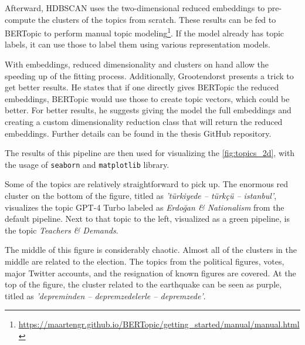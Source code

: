 Afterward, HDBSCAN uses the two-dimensional reduced embeddings to pre-compute the clusters of 
the topics from scratch. These results can be fed to BERTopic to perform manual topic 
modeling\footnote{\url{https://maartengr.github.io/BERTopic/getting_started/manual/manual.html}}.
If the model already has topic labels, it can use those to label them using various 
representation models.

With embeddings, reduced dimensionality and clusters on hand allow the speeding up of the fitting 
process. Additionally, Grootendorst presents a trick to get better results. 
He states that if one directly gives BERTopic the reduced embeddings, BERTopic would use those 
to create topic vectors, which could be better. For better results, he suggests giving the model 
the full embeddings and creating a custom dimensionality reduction class that will return the 
reduced embeddings. Further details can be found in the thesis GitHub repository.

The results of this pipeline are then used for visualizing the \autoref{fig:topics_2d}, 
with the usage of \texttt{seaborn} and \texttt{matplotlib} library.

Some of the topics are relatively straightforward to pick up. The enormous red cluster on the 
bottom of the figure, titled as \textit{'türkiyede -- türkçü -- istanbul'}, visualizes the 
topic GPT-4 Turbo labeled as \textit{Erdoğan \& Nationalism} from the default pipeline. 
Next to that topic to the left, visualized as a green pipeline, is the topic 
\textit{Teachers \& Demands}. 

The middle of this figure is considerably chaotic. Almost all of the clusters in the middle are 
related to the election. The topics from the political figures, votes, major Twitter accounts, 
and the resignation of known figures are covered. At the top of the figure, the cluster 
related to the earthquake can be seen as purple, titled as 
\textit{'depreminden -- depremzedelerle -- depremzede'}.

